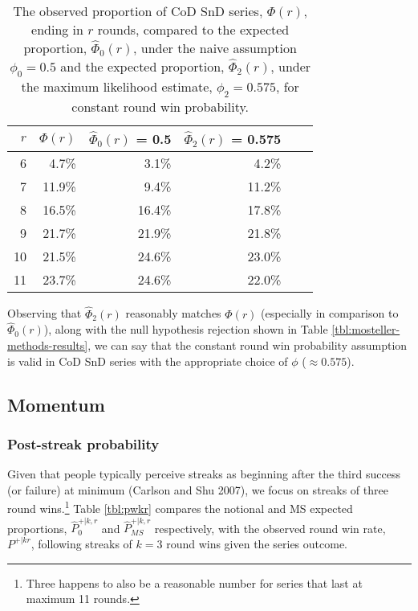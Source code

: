 \documentclass{article}
\begin{document}
\begin{table}
\caption{The observed proportion of CoD SnD series, $\Phi(r)$, ending in $r$ rounds, compared to the expected proportion, $\hat{\Phi}_0(r)$, under the naive assumption $\phi_0 = 0.5$ and the expected proportion, $\hat{\Phi}_2(r)$, under the maximum likelihood estimate, $\phi_2 = 0.575$, for constant round win probability.}

\centering
\begin{tabular}{rrrrrr}
\toprule
$r$ & $\Phi(r)$ & $\hat{\Phi}_0(r)$ = 0.5 & $\hat{\Phi}_2(r)$ = 0.575 \\
\midrule

6 & 4.7\% & 3.1\% & 4.2\% \\
7 & 11.9\% & 9.4\% & 11.2\% \\
8 & 16.5\% & 16.4\% & 17.8\% \\
9 & 21.7\% & 21.9\% & 21.8\% \\
10 & 21.5\% & 24.6\% & 23.0\% \\
11 & 23.7\% & 24.6\% & 22.0\% \\

\bottomrule
\end{tabular}

\label{tbl:alternative-constant-ps}

\end{table}

Observing that \(\hat{\Phi}_2(r)\) reasonably matches \(\Phi(r)\)
(especially in comparison to \(\hat{\Phi}_0(r)\)), along with the null
hypothesis rejection shown in Table \ref{tbl:mosteller-methods-results},
we can say that the constant round win probability assumption is valid
in CoD SnD series with the appropriate choice of \(\phi\)
(\(\approx 0.575\)).

\hypertarget{momentum-1}{%
\subsection{Momentum}\label{momentum-1}}

\hypertarget{post-streak-probability}{%
\subsubsection{Post-streak probability}\label{post-streak-probability}}

Given that people typically perceive streaks as beginning after the
third success (or failure) at minimum (Carlson and Shu 2007), we focus
on streaks of three round wins.\footnote{Three happens to also be a
  reasonable number for series that last at maximum 11 rounds.} Table
\ref{tbl:pwkr} compares the notional and MS expected proportions,
\(\hat{P}^{+|k,r}_0\) and \(\hat{P}^{+|k,r}_{MS}\) respectively, with
the observed round win rate, \(P^{+|kr}\), following streaks of \(k=3\)
round wins given the series outcome.
\end{document}
